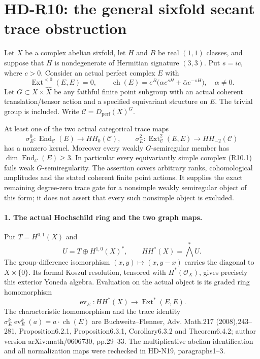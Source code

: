 \section{HD-R10: the general sixfold secant trace obstruction}
\label{sec:general-sixfold-secant-trace}

Let $X$ be a complex abelian sixfold, let $H$ and $B$ be real
$(1,1)$ classes, and suppose that $H$ is nondegenerate of Hermitian
signature $(3,3)$. Put $s=ic$, where $c>0$. Consider an actual
perfect complex $E$ with
\[
 \operatorname{Ext}^{<0}(E,E)=0,\qquad
 \operatorname{ch}(E)=e^B
       \bigl(\alpha e^{sH}+\bar\alpha e^{-sH}\bigr),
                         \quad\alpha\ne0.                 \tag{R10.1}
\]
Let $G\subset X\times\widehat X$ be any faithful finite point
subgroup with an actual coherent translation/tensor action and
a specified equivariant structure on $E$. The trivial group is
included. Write $\mathcal C=D_{\mathrm{perf}}(X)^G$.

At least one of the two actual categorical trace maps
\[
 \sigma_E^0:\operatorname{End}_{\mathcal C}(E)\longrightarrow HH_0(\mathcal C),
 \qquad
 \sigma_E^2:\operatorname{Ext}^2_{\mathcal C}(E,E)
                                      \longrightarrow HH_{-2}(\mathcal C)
                                                               \tag{R10.2}
\]
has a nonzero kernel. Moreover every weakly $G$-semiregular member
has $\dim\operatorname{End}_{\mathcal C}(E)\ge3$. In particular
every equivariantly simple complex (R10.1) fails weak
$G$-semiregularity. The assertion covers
arbitrary ranks, cohomological amplitudes and the stated coherent
finite point actions. It supplies the exact remaining degree-zero
trace gate for a nonsimple weakly semiregular object of this form;
it does not assert that every such nonsimple object is excluded.

\paragraph{1. The actual Hochschild ring and the two graph maps.}
Put $T=H^{0,1}(X)$ and
\[
 U=T\oplus H^{1,0}(X)^*,\qquad HH^*(X)=\bigwedge^*U.
                                                               \tag{R10.3}
\]
The group-difference isomorphism $(x,y)\mapsto(x,y-x)$ carries
the diagonal to $X\times\{0\}$. Its formal Koszul resolution,
tensored with $H^*(\mathcal O_X)$, gives precisely this exterior
Yoneda algebra. Evaluation on the actual object is its graded
ring homomorphism
\[
 \operatorname{ev}_E:HH^*(X)\longrightarrow\operatorname{Ext}^*(E,E).
                                                               \tag{R10.4}
\]
The characteristic homomorphism and the trace identity
$\sigma_E^k\operatorname{ev}_E^k(a)=a\cdot\operatorname{ch}(E)$
are Buchweitz--Flenner, Adv. Math.217 (2008),243--281,
Proposition6.2.1, Proposition6.3.1, Corollary6.3.2 and
Theorem6.4.2; author version arXiv:math/0606730, pp.29--33.
The multiplicative abelian identification and all normalization
maps were rechecked in HD-N19, paragraphs1--3.

